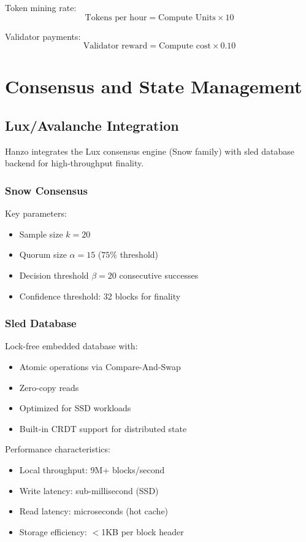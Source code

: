 \documentclass[11pt,twocolumn]{article}
\begin{document}
Token mining rate:
\begin{equation}
\text{Tokens per hour} = \text{Compute Units} \times 10
\end{equation}

Validator payments:
\begin{equation}
\text{Validator reward} = \text{Compute cost} \times 0.10
\end{equation}

\section{Consensus and State Management}

\subsection{Lux/Avalanche Integration}

Hanzo integrates the Lux consensus engine (Snow family) with sled database backend for high-throughput finality.

\subsubsection{Snow Consensus}

Key parameters:
\begin{itemize}
\item Sample size $k = 20$
\item Quorum size $\alpha = 15$ ($75\%$ threshold)
\item Decision threshold $\beta = 20$ consecutive successes
\item Confidence threshold: 32 blocks for finality
\end{itemize}

\subsubsection{Sled Database}

Lock-free embedded database with:
\begin{itemize}
\item Atomic operations via Compare-And-Swap
\item Zero-copy reads
\item Optimized for SSD workloads
\item Built-in CRDT support for distributed state
\end{itemize}

Performance characteristics:
\begin{itemize}
\item Local throughput: 9M+ blocks/second
\item Write latency: sub-millisecond (SSD)
\item Read latency: microseconds (hot cache)
\item Storage efficiency: $<$1KB per block header
\end{itemize}
\end{document}
